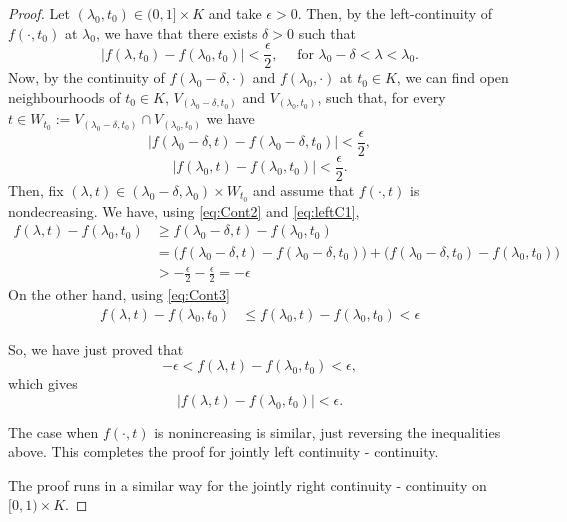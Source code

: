 \documentclass{amsart}
\begin{document}
\begin{proof}
Let $(\lambda_0,t_0)\in(0,1]\times K$ and take $\epsilon>0$. Then, by the left-continuity of $f(\cdot,t_0)$ at $\lambda_0$, we have that
there exists $\delta>0$ such that
\begin{equation}\label{eq:leftC1}
|f(\lambda,t_0)-f(\lambda_0,t_0)|<\frac{\epsilon}{2},  \quad \text{ for } \lambda_0-\delta<\lambda<\lambda_0.
\end{equation}
Now, by the continuity of $f(\lambda_0-\delta,\cdot)$ and $f(\lambda_0,\cdot)$ at $t_0\in K$, we can find open neighbourhoods of $t_0\in K$,  $V_{(\lambda_0-\delta, t_0)}$ and $V_{(\lambda_0, t_0)}$, such that, for every $t\in W_{t_0}:=V_{(\lambda_0-\delta, t_0)}\cap V_{(\lambda_0, t_0)}$ we have
\begin{equation}\label{eq:Cont2}
|f(\lambda_0-\delta,t)-f(\lambda_0-\delta,t_0)|<\frac{\epsilon}{2},  \end{equation}
\begin{equation}\label{eq:Cont3}
|f(\lambda_0,t)-f(\lambda_0,t_0)|<\frac{\epsilon}{2}.
\end{equation}
Then, fix
$(\lambda,t)\in(\lambda_0-\delta,\lambda_0)\times W_{t_0}$ and assume that $f(\cdot,t)$ is nondecreasing.  We have, using \eqref{eq:Cont2} and \eqref{eq:leftC1},
\begin{align*}
f(\lambda,t)-f(\lambda_0,t_0)&\geq f(\lambda_0-\delta,t)-f(\lambda_0,t_0)\\
&=\Big(f(\lambda_0-\delta,t)-f(\lambda_0-\delta,t_0)\Big)+\Big(f(\lambda_0-\delta,t_0)-f(\lambda_0,t_0)\Big)\\
&>-\frac{\epsilon}{2} -\frac{\epsilon}{2}=-\epsilon
\end{align*}
On the other hand, using \eqref{eq:Cont3}
\begin{align*}
f(\lambda,t)-f(\lambda_0,t_0)&\leq f(\lambda_0,t)-f(\lambda_0,t_0)<\epsilon
\end{align*}

So, we have just proved that
$$-\epsilon <f(\lambda,t)-f(\lambda_0,t_0)<\epsilon,$$
which gives
$$|f(\lambda,t)-f(\lambda_0,t_0)|<\epsilon.$$

The case when $f(\cdot,t)$ is nonincreasing is similar, just reversing the inequalities above. This completes the proof for jointly left continuity - continuity.

The proof runs in a similar way for the jointly right continuity - continuity on $[0,1)\times K$.
\end{proof}
\end{document}

